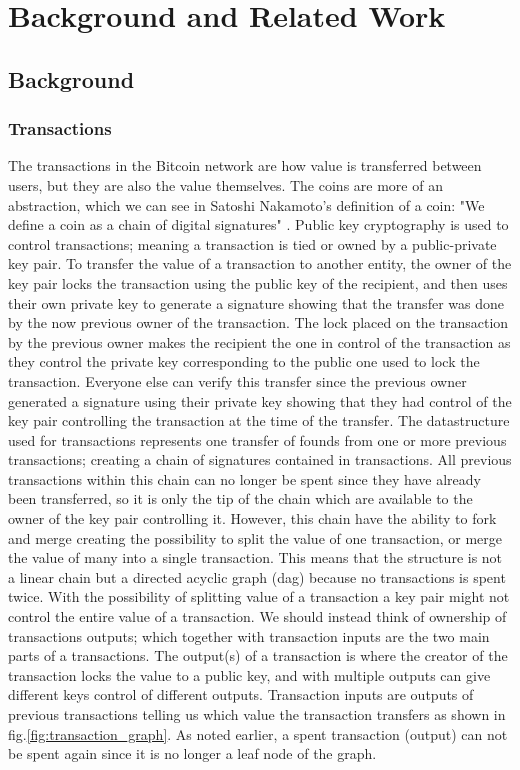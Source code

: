 \chapter{Background and Related Work}
\label{chap:related}

\section{Background}
\label{sec:background}

\subsection{Transactions}
\label{subsec:transactions}

The transactions in the Bitcoin network are how value is transferred between users, but they are also the value themselves.
The coins are more of an abstraction, which we can see in Satoshi Nakamoto's definition of a coin: "We define a coin as a chain of digital signatures" \cite{nakamoto2008bitcoin}.
Public key cryptography is used to control transactions; meaning a transaction is tied or owned by a public-private key pair.
To transfer the value of a transaction to another entity, the owner of the key pair locks the transaction using the public key of the recipient, and then uses their own private key to generate a signature showing that the transfer was done by the now previous owner of the transaction. The lock placed on the transaction by the previous owner makes the recipient the one in control of the transaction as they control the private key corresponding to the public one used to lock the transaction. Everyone else  can verify this transfer since the previous owner generated a signature using their private key showing that they had control of the key pair controlling the transaction at the time of the transfer. The datastructure used for transactions represents one transfer of founds from one or more previous transactions; creating a chain of signatures contained in transactions. All previous transactions within this chain can no longer be spent since they have already been transferred, so it is only the tip of the chain which are available to the owner of the key pair controlling it. However, this chain have the ability to fork and merge creating the possibility to split the value of one transaction, or merge the value of many into a single transaction. This means that the structure is not a linear chain but a directed acyclic graph (dag) because no transactions is spent twice.
With the possibility of splitting value of a transaction a key pair might not control the entire value of a transaction. We should instead think of ownership of transactions outputs; which together with transaction inputs are the two main parts of a transactions. The output(s) of a transaction is where the creator of the transaction locks the value to a public key, and with multiple outputs can give different keys control of different outputs. Transaction inputs are outputs of previous transactions telling us which value the transaction transfers as shown in fig.\ref{fig:transaction_graph}. As noted earlier, a spent transaction (output) can not be spent again since it is no longer a leaf node of the graph.%
